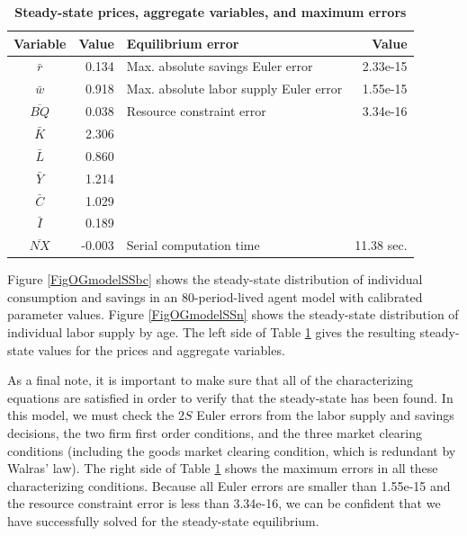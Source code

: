 \documentclass[letterpaper,12pt]{article}
\theoremstyle{definition}
\begin{document}
    \begin{table}[htbp] \centering \captionsetup{width=4.8in}
    \caption{\label{TabOGmodelSSaggr}\textbf{Steady-state prices, aggregate variables, and maximum errors}}
      \begin{threeparttable}
      \begin{tabular}{>{\small}c >{\small}r |>{\small}l >{\small}r}
        \hline\hline
        Variable & Value & Equilibrium error & Value \\
        \hline
        $\bar{r}$ & 0.134 & Max. absolute savings Euler error & 2.33e-15 \\
        $\bar{w}$ & 0.918 & Max. absolute labor supply Euler error & 1.55e-15 \\
        $\overline{BQ}$ & 0.038 & Resource constraint error & 3.34e-16 \\
        $\bar{K}$ & 2.306 &  &  \\
        $\bar{L}$ & 0.860 &  &  \\
        $\bar{Y}$ & 1.214 &  &  \\
        $\bar{C}$ & 1.029 &  &  \\
        $\bar{I}$ & 0.189 &  &  \\
        $\overline{NX}$ & -0.003 & Serial computation time & 11.38 sec. \\
        \hline\hline
      \end{tabular}
      \end{threeparttable}
    \end{table}

    Figure \ref{FigOGmodelSSbc} shows the steady-state distribution of individual consumption and savings in an 80-period-lived agent model with calibrated parameter values. Figure \ref{FigOGmodelSSn} shows the steady-state distribution of individual labor supply by age. The left side of Table \ref{TabOGmodelSSaggr} gives the resulting steady-state values for the prices and aggregate variables.

    As a final note, it is important to make sure that all of the characterizing equations are satisfied in order to verify that the steady-state has been found. In this model, we must check the $2S$ Euler errors from the labor supply and savings decisions, the two firm first order conditions, and the three market clearing conditions (including the goods market clearing condition, which is redundant by Walras' law). The right side of Table \ref{TabOGmodelSSaggr} shows the maximum errors in all these characterizing conditions. Because all Euler errors are smaller than 1.55e-15 and the resource constraint error is less than 3.34e-16, we can be confident that we have successfully solved for the steady-state equilibrium.
\end{document}
